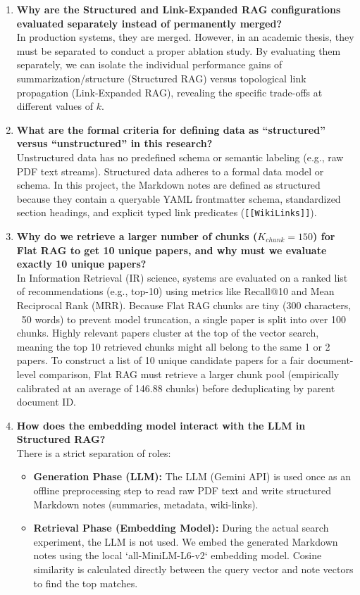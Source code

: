 \begin{enumerate}[label=\textbf{Q\arabic*:}, leftmargin=*]
    \item \textbf{Why are the Structured and Link-Expanded RAG configurations evaluated separately instead of permanently merged?} \\
    In production systems, they are merged. However, in an academic thesis, they must be separated to conduct a proper ablation study. By evaluating them separately, we can isolate the individual performance gains of summarization/structure (Structured RAG) versus topological link propagation (Link-Expanded RAG), revealing the specific trade-offs at different values of $k$.

    \item \textbf{What are the formal criteria for defining data as ``structured'' versus ``unstructured'' in this research?} \\
    Unstructured data has no predefined schema or semantic labeling (e.g., raw PDF text streams). Structured data adheres to a formal data model or schema. In this project, the Markdown notes are defined as structured because they contain a queryable YAML frontmatter schema, standardized section headings, and explicit typed link predicates (\texttt{[[WikiLinks]]}).

    \item \textbf{Why do we retrieve a larger number of chunks ($K_{chunk} = 150$) for Flat RAG to get 10 unique papers, and why must we evaluate exactly 10 unique papers?} \\
    In Information Retrieval (IR) science, systems are evaluated on a ranked list of recommendations (e.g., top-10) using metrics like Recall@10 and Mean Reciprocal Rank (MRR). 
    Because Flat RAG chunks are tiny (300 characters, ~50 words) to prevent model truncation, a single paper is split into over 100 chunks. Highly relevant papers cluster at the top of the vector search, meaning the top 10 retrieved chunks might all belong to the same 1 or 2 papers. To construct a list of 10 unique candidate papers for a fair document-level comparison, Flat RAG must retrieve a larger chunk pool (empirically calibrated at an average of 146.88 chunks) before deduplicating by parent document ID.

    \item \textbf{How does the embedding model interact with the LLM in Structured RAG?} \\
    There is a strict separation of roles:
    \begin{itemize}
        \item \textbf{Generation Phase (LLM):} The LLM (Gemini API) is used once as an offline preprocessing step to read raw PDF text and write structured Markdown notes (summaries, metadata, wiki-links).
        \item \textbf{Retrieval Phase (Embedding Model):} During the actual search experiment, the LLM is not used. We embed the generated Markdown notes using the local `all-MiniLM-L6-v2` embedding model. Cosine similarity is calculated directly between the query vector and note vectors to find the top matches.
    \end{itemize}


\end{enumerate}

